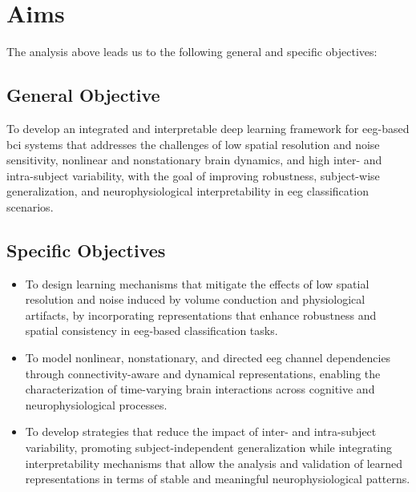 \chapter{Aims}

The analysis above leads us to the following general and specific objectives:

\section{General Objective}

To develop an integrated and interpretable deep learning framework for \gls{eeg}-based \gls{bci} systems that addresses the challenges of low spatial resolution and noise sensitivity, nonlinear and nonstationary brain dynamics, and high inter- and intra-subject variability, with the goal of improving robustness, subject-wise generalization, and neurophysiological interpretability in \gls{eeg} classification scenarios.

\section{Specific Objectives}

\begin{itemize}
	\item[1] To design learning mechanisms that mitigate the effects of low spatial resolution and noise induced by volume conduction and physiological artifacts, by incorporating representations that enhance robustness and spatial consistency in \gls{eeg}-based classification tasks.
 
	\item[2] To model nonlinear, nonstationary, and directed \gls{eeg} channel dependencies through connectivity-aware and dynamical representations, enabling the characterization of time-varying brain interactions across cognitive and neurophysiological processes.
    
    \item[3] To develop strategies that reduce the impact of inter- and intra-subject variability, promoting subject-independent generalization while integrating interpretability mechanisms that allow the analysis and validation of learned representations in terms of stable and meaningful neurophysiological patterns.
\end{itemize}

